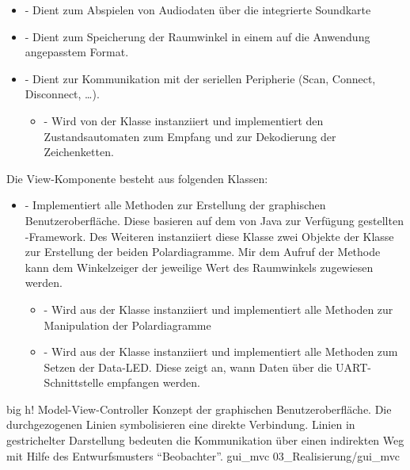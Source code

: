 \begin{itemize}
    \item {} - Dient zum Abspielen von Audiodaten über die integrierte Soundkarte
    \item {} - Dient zum Speicherung der Raumwinkel in einem auf die Anwendung angepasstem Format.
    \item {} - Dient zur Kommunikation mit der seriellen Peripherie (Scan, Connect, Disconnect, \dots).
       \begin{itemize}
            \item {} - Wird von der Klasse  instanziiert und implementiert den Zustandsautomaten zum Empfang und zur Dekodierung der Zeichenketten.
       \end{itemize}
\end{itemize}


Die View-Komponente besteht aus folgenden Klassen:

\begin{itemize}
    \item {} - Implementiert alle Methoden zur Erstellung der graphischen Benutzeroberfläche. Diese basieren auf dem von Java zur Verfügung gestellten -Framework. Des Weiteren instanziiert diese Klasse zwei Objekte der Klasse  zur Erstellung der beiden Polardiagramme. Mir dem Aufruf der Methode  kann dem Winkelzeiger der jeweilige Wert des Raumwinkels zugewiesen werden.
        \begin{itemize}
            \item {} - Wird aus der Klasse  instanziiert und implementiert alle Methoden zur Manipulation der Polardiagramme
            \item {} - Wird aus der Klasse  instanziiert und implementiert alle Methoden zum Setzen der Data-LED. Diese zeigt an, wann Daten über die UART-Schnittstelle empfangen werden.
        \end{itemize}
\end{itemize}


         {big}                                              %
         {h!}                                                  %
         {Model-View-Controller Konzept der graphischen Benutzeroberfläche. Die durchgezogenen Linien symbolisieren eine direkte Verbindung. Linien in gestrichelter Darstellung bedeuten die Kommunikation über einen indirekten Weg mit Hilfe des Entwurfsmusters "`Beobachter"'.}       %
         {gui_mvc}                                 %
         {03_Realisierung/gui_mvc}



